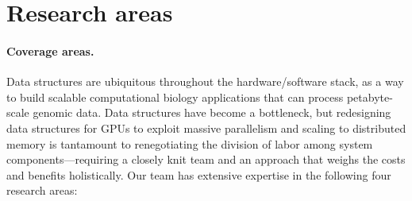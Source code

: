 \section{Research areas}





\paragraph{Coverage areas.}
Data structures are ubiquitous throughout the hardware/software stack, as a way to build scalable computational biology applications that can process petabyte-scale genomic data.
Data structures have become a bottleneck, but redesigning data structures for GPUs to exploit massive parallelism and scaling to distributed memory is tantamount to renegotiating the division of labor among system components---requiring a closely knit team and an approach that weighs the costs and benefits holistically.
Our team has extensive expertise in the following four research areas:


